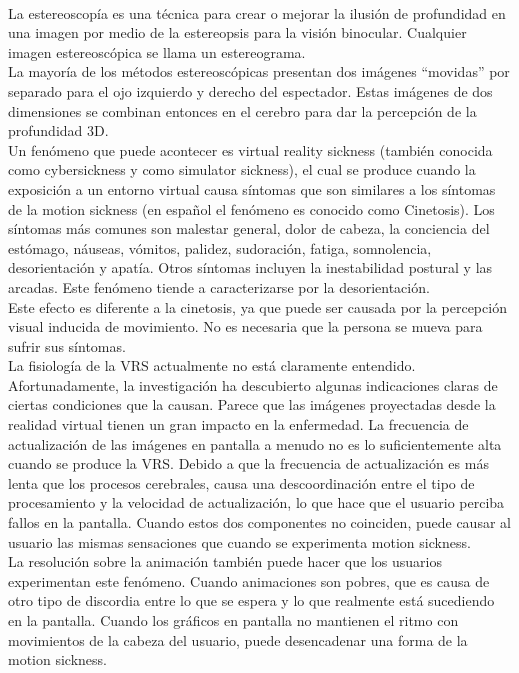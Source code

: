 \documentclass[12pt]{article}
\begin{document}
\\La estereoscopía es una técnica para crear o mejorar la ilusión de profundidad en una imagen por medio de la estereopsis para la visión binocular. Cualquier imagen estereoscópica se llama un estereograma. 
\\La mayoría de los métodos estereoscópicas presentan  dos imágenes “movidas” por separado para el ojo izquierdo y derecho del espectador. Estas imágenes de dos dimensiones se combinan entonces en el cerebro para dar la percepción de la profundidad 3D.
\\Un fenómeno que puede acontecer es virtual reality sickness (también conocida como cybersickness y como simulator sickness), el cual se produce cuando la exposición a un entorno virtual causa síntomas que son similares a los síntomas de la motion sickness\cite{VRS} (en español el fenómeno es conocido como Cinetosis). Los síntomas más comunes son malestar general, dolor de cabeza, la conciencia del estómago, náuseas, vómitos, palidez, sudoración, fatiga, somnolencia, desorientación y apatía. Otros síntomas incluyen la inestabilidad postural y las arcadas. Este fenómeno tiende a caracterizarse por la desorientación.
\\Este efecto es diferente a la cinetosis, ya que puede ser causada por la percepción visual inducida de movimiento. No es necesaria que la persona se mueva para sufrir sus síntomas.
\\La fisiología de la VRS actualmente no está claramente entendido. Afortunadamente, la investigación ha descubierto algunas indicaciones claras de ciertas condiciones que la causan. Parece que las imágenes proyectadas desde la realidad virtual tienen un gran impacto en la enfermedad. La frecuencia de actualización de las imágenes en pantalla a menudo no es lo suficientemente alta cuando se produce la VRS. Debido a que la frecuencia de actualización es más lenta que los procesos cerebrales, causa una descoordinación entre el tipo de procesamiento y la velocidad de actualización, lo que hace que el usuario perciba fallos en la pantalla. Cuando estos dos componentes no coinciden, puede causar al usuario las mismas sensaciones que cuando se experimenta motion sickness.
\\La resolución sobre la animación también puede hacer que los usuarios experimentan este fenómeno\cite{oculussickness}. Cuando animaciones son pobres, que es causa de otro tipo de discordia entre lo que se espera y lo que realmente está sucediendo en la pantalla. Cuando los gráficos en pantalla no mantienen el ritmo con movimientos de la cabeza del usuario, puede desencadenar una forma de la motion sickness.
\end{document}
